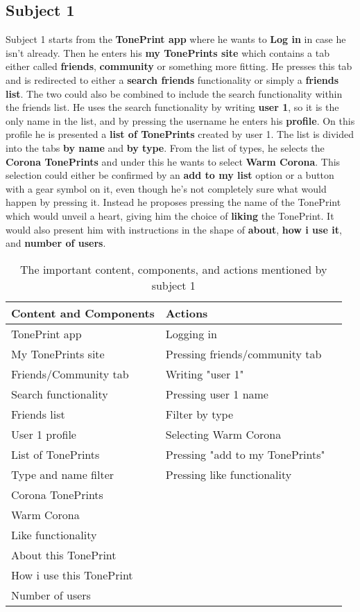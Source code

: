 \subsection*{Subject 1}
\label{Subject1}
Subject 1 starts from the \textbf{TonePrint app} where he wants to \textbf{Log in} in case he isn't already. Then he enters his \textbf{my TonePrints site} which contains a tab either called \textbf{friends}, \textbf{community} or something more fitting. He presses this tab and is redirected to either a \textbf{search friends} functionality or simply a \textbf{friends list}. The two could also be combined to include the search functionality within the friends list. He uses the search functionality by writing \textbf{user 1}, so it is the only name in the list, and by pressing the username he enters his \textbf{profile}. On this profile he is presented a \textbf{list of TonePrints} created by user 1. The list is divided into the tabs \textbf{by name} and \textbf{by type}. From the list of types, he selects the \textbf{Corona TonePrints} and under this he wants to select \textbf{Warm Corona}. This selection could either be confirmed by an \textbf{add to my list} option or a button with a gear symbol on it, even though he's not completely sure what would happen by pressing it. Instead he proposes pressing the name of the TonePrint which would unveil a heart, giving him the choice of \textbf{liking} the TonePrint. It would also present him with instructions in the shape of \textbf{about}, \textbf{how i use it}, and \textbf{number of users}.\\
%
\begin{table}[H]
\begin{minipage}[b]{\linewidth}\centering
	\begin{tabular} {|l|l|l|} \hline
		\rowcolor{xGray25} \textbf{Content and Components} & \textbf{Actions} \\  \hline
		TonePrint app & Logging in \\
		My TonePrints site & Pressing friends/community tab \\
		Friends/Community tab & Writing "user 1" \\
		Search functionality & Pressing user 1 name \\
		Friends list & Filter by type \\
		User 1 profile & Selecting Warm Corona \\
		List of TonePrints & Pressing "add to my TonePrints" \\
		Type and name filter & Pressing like functionality \\
		Corona TonePrints & \\
		Warm Corona & \\
		Like functionality & \\
		About this TonePrint & \\
		How i use this TonePrint & \\
		Number of users & \\ \hline
	\end{tabular}
	\caption{The important content, components, and actions mentioned by subject 1}
	\label{tab:Subject1ContentActions}
\end{minipage}
\end{table}
